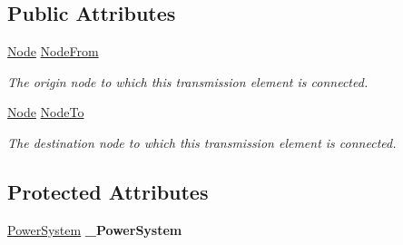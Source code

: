 \subsection*{Public Attributes}
\begin{DoxyCompactItemize}
\item 
\hyperlink{class_power_system_planning_1_1_node}{Node} \hyperlink{class_power_system_planning_1_1_transmission_element_a361691d8c6720d32ab4e2be4e77233b3}{Node\+From}
\begin{DoxyCompactList}\small\item\em The origin node to which this transmission element is connected. \end{DoxyCompactList}\item 
\hyperlink{class_power_system_planning_1_1_node}{Node} \hyperlink{class_power_system_planning_1_1_transmission_element_adfffaeb9dab17f7f2bafec0f319b2fe5}{Node\+To}
\begin{DoxyCompactList}\small\item\em The destination node to which this transmission element is connected. \end{DoxyCompactList}\end{DoxyCompactItemize}
\subsection*{Protected Attributes}
\begin{DoxyCompactItemize}
\item 
\hyperlink{class_power_system_planning_1_1_power_system}{Power\+System} {\bfseries \+\_\+\+Power\+System}\hypertarget{class_power_system_planning_1_1_transmission_element_ada6e1f248db79f8e2b8216a697f261e5}{}\label{class_power_system_planning_1_1_transmission_element_ada6e1f248db79f8e2b8216a697f261e5}

\end{DoxyCompactItemize}
